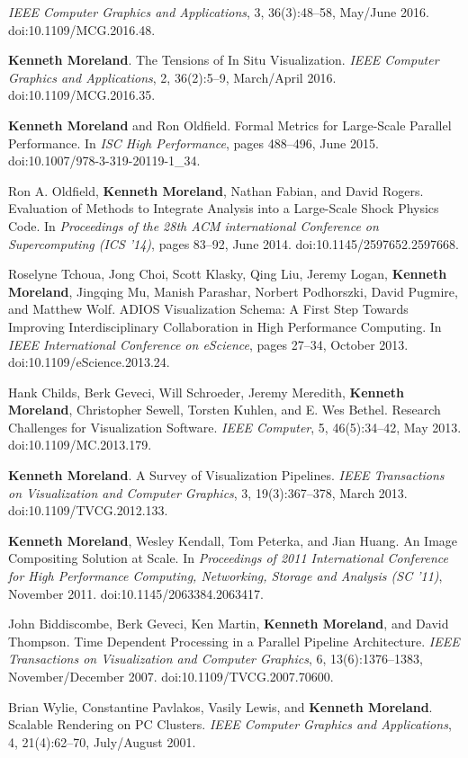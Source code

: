 \begin{enumerate}[label={[\arabic*]}, left=0pt]
  \emph{IEEE Computer Graphics and Applications}, 3, 36(3):48--58, May/June 2016.
  doi:10.1109/MCG.2016.48.
\item  %
  \textbf{Kenneth Moreland}.
  The Tensions of In Situ Visualization.
  \emph{IEEE Computer Graphics and Applications}, 2, 36(2):5--9, March/April 2016.
  doi:10.1109/MCG.2016.35.
\item  %
  \textbf{Kenneth Moreland} and Ron Oldfield.
  Formal Metrics for Large-Scale Parallel Performance.
  In \emph{ISC High Performance}, pages 488--496, June 2015.
  doi:10.1007/978-3-319-20119-1\_34.
\item  %
  Ron A. Oldfield, \textbf{Kenneth Moreland}, Nathan Fabian, and David Rogers.
  Evaluation of Methods to Integrate Analysis into a Large-Scale Shock Physics Code.
  In \emph{Proceedings of the 28th ACM international Conference on Supercomputing (ICS '14)}, pages 83--92, June 2014.
  doi:10.1145/2597652.2597668.
\item  %
  Roselyne Tchoua, Jong Choi, Scott Klasky, Qing Liu, Jeremy Logan, \textbf{Kenneth Moreland}, Jingqing Mu, Manish Parashar, Norbert Podhorszki, David Pugmire, and Matthew Wolf.
  {ADIOS} Visualization Schema: A First Step Towards Improving Interdisciplinary Collaboration in High Performance Computing.
  In \emph{IEEE International Conference on eScience}, pages 27--34, October 2013.
  doi:10.1109/eScience.2013.24.
\item  %
  Hank Childs, Berk Geveci, Will Schroeder, Jeremy Meredith, \textbf{Kenneth Moreland}, Christopher Sewell, Torsten Kuhlen, and E. Wes Bethel.
  Research Challenges for Visualization Software.
  \emph{IEEE Computer}, 5, 46(5):34--42, May 2013.
  doi:10.1109/MC.2013.179.
\item  %
  \textbf{Kenneth Moreland}.
  A Survey of Visualization Pipelines.
  \emph{IEEE Transactions on Visualization and Computer Graphics}, 3, 19(3):367--378, March 2013.
  doi:10.1109/TVCG.2012.133.
\item  %
  \textbf{Kenneth Moreland}, Wesley Kendall, Tom Peterka, and Jian Huang.
  An Image Compositing Solution at Scale.
  In \emph{Proceedings of 2011 International Conference for High Performance Computing, Networking, Storage and Analysis (SC '11)}, November 2011.
  doi:10.1145/2063384.2063417.
\item  %
  John Biddiscombe, Berk Geveci, Ken Martin, \textbf{Kenneth Moreland}, and David Thompson.
  Time Dependent Processing in a Parallel Pipeline Architecture.
  \emph{IEEE Transactions on Visualization and Computer Graphics}, 6, 13(6):1376--1383, November/December 2007.
  doi:10.1109/TVCG.2007.70600.
\item  %
  Brian Wylie, Constantine Pavlakos, Vasily Lewis, and \textbf{Kenneth Moreland}.
  Scalable Rendering on {PC} Clusters.
  \emph{IEEE Computer Graphics and Applications}, 4, 21(4):62--70, July/August 2001.
\end{enumerate}